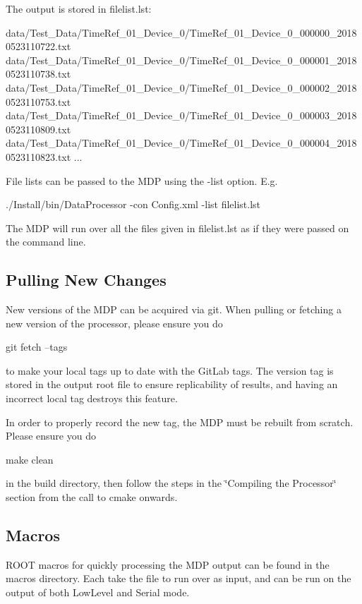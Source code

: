 The output is stored in {\ttfamily filelist.\+lst}\+: 
\begin{DoxyCode}
data/Test\_Data/TimeRef\_01\_Device\_0/TimeRef\_01\_Device\_0\_000000\_20180523110722.txt
data/Test\_Data/TimeRef\_01\_Device\_0/TimeRef\_01\_Device\_0\_000001\_20180523110738.txt
data/Test\_Data/TimeRef\_01\_Device\_0/TimeRef\_01\_Device\_0\_000002\_20180523110753.txt
data/Test\_Data/TimeRef\_01\_Device\_0/TimeRef\_01\_Device\_0\_000003\_20180523110809.txt
data/Test\_Data/TimeRef\_01\_Device\_0/TimeRef\_01\_Device\_0\_000004\_20180523110823.txt
...
\end{DoxyCode}


File lists can be passed to the M\+DP using the {\ttfamily -\/list} option. E.\+g. 
\begin{DoxyCode}
./Install/bin/DataProcessor -con Config.xml -list filelist.lst
\end{DoxyCode}


The M\+DP will run over all the files given in {\ttfamily filelist.\+lst} as if they were passed on the command line.

\subsection*{Pulling New Changes \label{_Pulling}%
}

New versions of the M\+DP can be acquired via git. When pulling or fetching a new version of the processor, please ensure you do 
\begin{DoxyCode}
git fetch --tags
\end{DoxyCode}
 to make your local tags up to date with the Git\+Lab tags. The version tag is stored in the output root file to ensure replicability of results, and having an incorrect local tag destroys this feature.

In order to properly record the new tag, the M\+DP must be rebuilt from scratch. Please ensure you do 
\begin{DoxyCode}
make clean
\end{DoxyCode}
 in the build directory, then follow the steps in the \char`\"{}\+Compiling the Processor\char`\"{} section from the call to {\ttfamily cmake} onwards.

\subsection*{Macros \label{_Macros}%
}

R\+O\+OT macros for quickly processing the M\+DP output can be found in the {\ttfamily macros} directory. Each take the file to run over as input, and can be run on the output of both {\ttfamily Low\+Level} and {\ttfamily Serial} mode.

